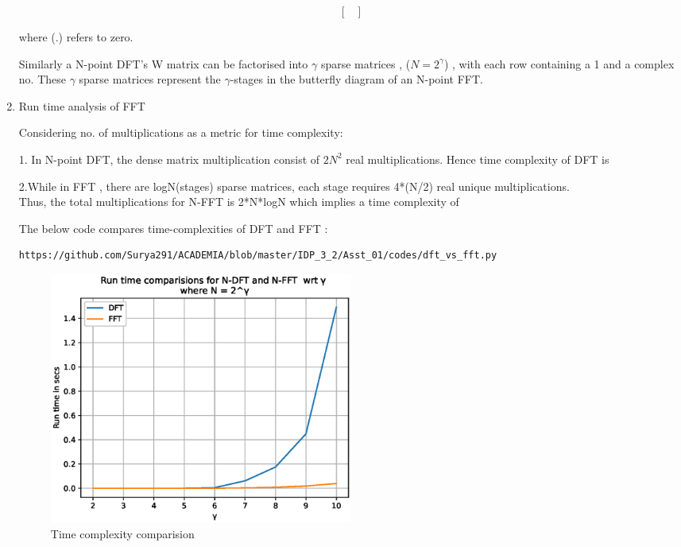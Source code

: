 \documentclass[journal,12pt,twocolumn]{IEEEtran}
\renewcommand\thesection{\arabic{section}}
\begin{document}
\begin{enumerate}[label=\thesection.\arabic*.,ref=\thesection.\theenumi]
\begin{equation}
\begin{bmatrix}
\end{bmatrix}
\end{equation}

where (.) refers to zero.

Similarly a N-point DFT's W matrix can be factorised into $\gamma$ sparse matrices , ($N = 2^{\gamma}$) , with each row containing a 1 and a complex no. These $\gamma$ sparse matrices represent the $\gamma$-stages in the butterfly diagram of an N-point FFT.\\

\item Run time analysis of FFT  \bigskip

Considering no. of multiplications as a metric for time complexity:

1. In N-point DFT, the dense matrix multiplication consist of $2N^{2}$ real multiplications.
Hence time complexity of DFT is  \bigskip

2.While in FFT , there are logN(stages) sparse matrices, each stage requires 4*(N/2) real unique multiplications.\\
Thus, the total multiplications for N-FFT is 2*N*logN  which implies a time complexity of \bigskip

The below code compares time-complexities of DFT and FFT  :
\begin{lstlisting}
https://github.com/Surya291/ACADEMIA/blob/master/IDP_3_2/Asst_01/codes/dft_vs_fft.py
\end{lstlisting}
 
 \begin{figure}[!ht]
	\includegraphics[width=10cm]{figs/dft_vs_fft.eps}
	\caption{Time complexity comparision}
\end{figure}


\end{enumerate}
\end{document}
